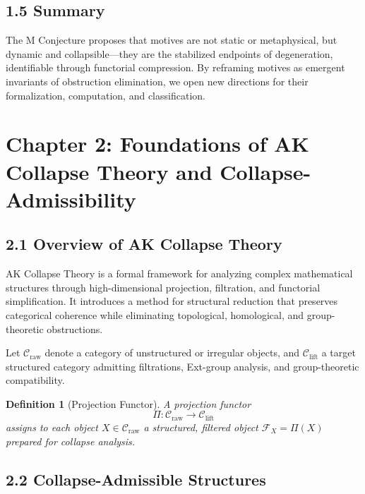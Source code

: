\documentclass[11pt]{article}
\newtheorem{definition}[theorem]{Definition}
\begin{document}
\subsection{1.5 Summary}

The M Conjecture proposes that motives are not static or metaphysical, but dynamic and collapsible---they are the stabilized endpoints of degeneration, identifiable through functorial compression. By reframing motives as emergent invariants of obstruction elimination, we open new directions for their formalization, computation, and classification.

\FloatBarrier




\section{Chapter 2: Foundations of AK Collapse Theory and Collapse-Admissibility}

\subsection{2.1 Overview of AK Collapse Theory}

AK Collapse Theory is a formal framework for analyzing complex mathematical structures through high-dimensional projection, filtration, and functorial simplification. It introduces a method for structural reduction that preserves categorical coherence while eliminating topological, homological, and group-theoretic obstructions.

Let $\mathcal{C}_{\mathrm{raw}}$ denote a category of unstructured or irregular objects, and $\mathcal{C}_{\mathrm{lift}}$ a target structured category admitting filtrations, Ext-group analysis, and group-theoretic compatibility.

\begin{definition}[Projection Functor]
A projection functor
\[
\Pi: \mathcal{C}_{\mathrm{raw}} \rightarrow \mathcal{C}_{\mathrm{lift}}
\]
assigns to each object $X \in \mathcal{C}_{\mathrm{raw}}$ a structured, filtered object $\mathcal{F}_X = \Pi(X)$ prepared for collapse analysis.
\end{definition}

\subsection{2.2 Collapse-Admissible Structures}
\end{document}
